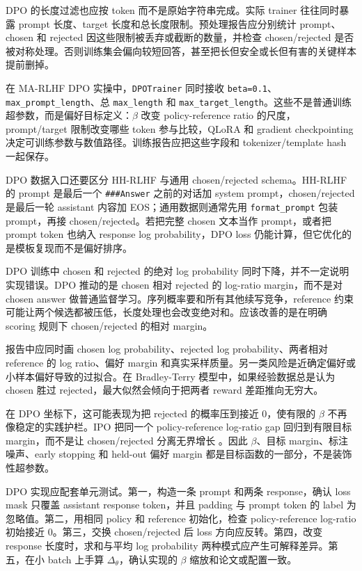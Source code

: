 \documentclass[UTF8,zihao=-4,openany]{ctexbook}
\begin{document}
DPO 的长度过滤也应按 token 而不是原始字符串完成。实际 trainer 往往同时暴露 prompt 长度、target 长度和总长度限制。预处理报告应分别统计 prompt、chosen 和 rejected 因这些限制被丢弃或截断的数量，并检查 chosen/rejected 是否被对称处理。否则训练集会偏向较短回答，甚至把长但安全或长但有害的关键样本提前删掉。

在 MA-RLHF DPO 实操中，\texttt{DPOTrainer} 同时接收 \texttt{beta=0.1}、\texttt{max\_prompt\_length}、总 \texttt{max\_length} 和 \texttt{max\_target\_length}。这些不是普通训练超参数，而是偏好目标定义：$\beta$ 改变 policy-reference ratio 的尺度，prompt/target 限制改变哪些 token 参与比较，QLoRA 和 gradient checkpointing 决定可训练参数与数值路径。训练报告应把这些字段和 tokenizer/template hash 一起保存。

DPO 数据入口还要区分 HH-RLHF 与通用 chosen/rejected schema。HH-RLHF 的 prompt 是最后一个 \texttt{\#\#\#Answer} 之前的对话加 system prompt，chosen/rejected 是最后一轮 assistant 内容加 EOS；通用数据则通常先用 \texttt{format\_prompt} 包装 prompt，再接 chosen/rejected。若把完整 chosen 文本当作 prompt，或者把 prompt token 也纳入 response log probability，DPO loss 仍能计算，但它优化的是模板复现而不是偏好排序。

DPO 训练中 chosen 和 rejected 的绝对 log probability 同时下降，并不一定说明实现错误。DPO 推动的是 chosen 相对 rejected 的 log-ratio margin，而不是对 chosen answer 做普通监督学习。序列概率要和所有其他续写竞争，reference 约束可能让两个候选都被压低，长度处理也会改变绝对和。应该改善的是在明确 scoring 规则下 chosen/rejected 的相对 margin。

报告中应同时画 chosen log probability、rejected log probability、两者相对 reference 的 log ratio、偏好 margin 和真实采样质量。另一类风险是近确定偏好或小样本偏好导致的过拟合。在 Bradley-Terry 模型中，如果经验数据总是认为 chosen 胜过 rejected，最大似然会倾向于把两者 reward 差距推向无穷大。

在 DPO 坐标下，这可能表现为把 rejected 的概率压到接近 0，使有限的 $\beta$ 不再像稳定的实践护栏。IPO 把同一个 policy-reference log-ratio gap 回归到有限目标 margin，而不是让 chosen/rejected 分离无界增长 \cite{azar2024general}。因此 $\beta$、目标 margin、标注噪声、early stopping 和 held-out 偏好 margin 都是目标函数的一部分，不是装饰性超参数。

DPO 实现应配套单元测试。第一，构造一条 prompt 和两条 response，确认 loss mask 只覆盖 assistant response token，并且 padding 与 prompt token 的 label 为忽略值。第二，用相同 policy 和 reference 初始化，检查 policy-reference log-ratio 初始接近 0。第三，交换 chosen/rejected 后 loss 方向应反转。第四，改变 response 长度时，求和与平均 log probability 两种模式应产生可解释差异。第五，在小 batch 上手算 $\Delta_\theta$，确认实现的 $\beta$ 缩放和论文或配置一致。
\end{document}
